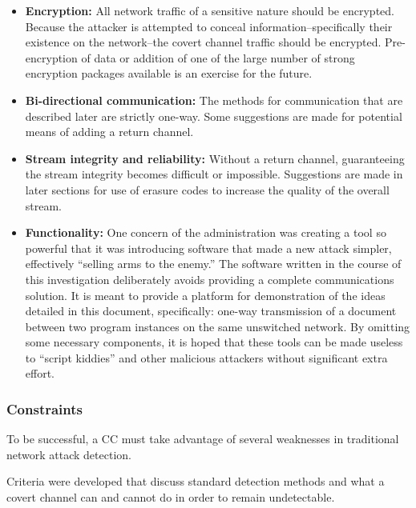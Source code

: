 \documentclass[letterpaper,10pt,draft]{article}
\begin{document}
\begin{itemize}
\item \textbf{Encryption:} All network traffic of a sensitive nature
should be encrypted.  Because the attacker is attempted to conceal
information--specifically their existence on the network--the covert
channel traffic should be encrypted.  Pre-encryption of data or
addition of one of the large number of strong encryption packages
available is an exercise for the future.

\item \textbf{Bi-directional communication:} The methods for
communication that are described later are strictly one-way.  Some
suggestions are made for potential means of adding a return channel.

\item \textbf{Stream integrity and reliability:} Without a return
channel, guaranteeing the stream integrity becomes difficult or
impossible.  Suggestions are made in later sections for use of erasure
codes to increase the quality of the overall stream.

\item \textbf{Functionality:} One concern of the administration was
creating a tool so powerful that it was introducing software that made
a new attack simpler, effectively ``selling arms to the enemy.''  The
software written in the course of this investigation deliberately
avoids providing a complete communications solution.  It is meant to
provide a platform for demonstration of the ideas detailed in this
document, specifically: one-way transmission of a document between two
program instances on the same unswitched network.  By omitting some
necessary components, it is hoped that these tools can be made useless
to ``script kiddies'' and other malicious attackers without
significant extra effort.

\end{itemize}

\subsubsection{Constraints}

To be successful, a CC must take advantage of several weaknesses in
traditional network attack detection.  

Criteria were developed that discuss standard detection methods
and what a covert channel can and cannot do in order to
remain undetectable.

\end{document}
